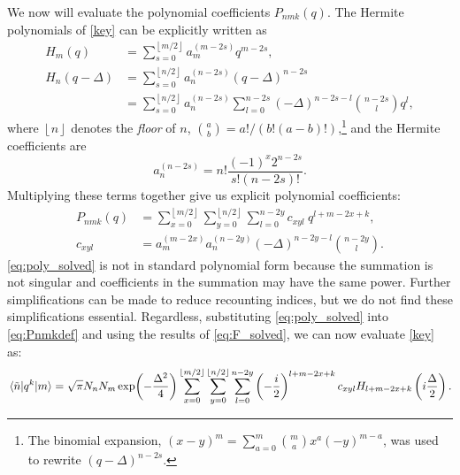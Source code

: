 \documentclass[aip, jcp, reprint, onecolumn, nofootinbib]{revtex4-2}
\begin{document}
We now will evaluate the polynomial coefficients $P_{nmk}(q)$.
The Hermite polynomials of \autoref{key} can be explicitly written as\cite{MorseFeshbach}
\begin{equation}
\begin{split}
	H_m(q) &= \sum_{s=0}^{\left\lfloor{m/2}\right\rfloor} a_m^{(m-2s)} q^{m-2s}, \\
	H_n(q-\Delta) &= \sum_{s=0}^{\left\lfloor{n/2}\right\rfloor}
	a_n^{(n-2s)} (q-\Delta)^{n-2s} \\
		&= \sum_{s=0}^{\left\lfloor{n/2}\right\rfloor} a_n^{(n-2s)} \sum_{l=0}^{n-2s} \left(-\Delta\right)^{n-2s-l} \binom{n-2s}{l} q^l,
\end{split}
\end{equation}
where $\left\lfloor n \right\rfloor$ denotes the \textit{floor} of $n$, $\binom{a}{b} = a! / (b!(a-b)!)$,\footnote{
	The binomial expansion, $(x-y)^m = \sum_{a=0}^m \binom{m}{a} x^a (-y)^{m-a}$, was used to rewrite $(q-\Delta)^{n-2s}$.
} and the Hermite coefficients are
\begin{equation}
	a_n^{(n-2s)} = n! \frac{(-1)^x 2^{n-2s}}{s!(n-2s)!}.
\end{equation}
Multiplying these terms together give us explicit polynomial coefficients:
\begin{equation}\label{eq:poly_solved}
\begin{split}
	P_{nmk}(q) %
	&= \sum_{x=0}^{\left\lfloor{m/2}\right\rfloor} \sum_{y=0}^{\left\lfloor{n/2}\right\rfloor} \sum_{l=0}^{n-2y} c_{xyl} \ q^{l+m-2x+k}, \\
	c_{xyl} &= a_m^{(m-2x)} a_n^{(n-2y)} \left(-\Delta\right)^{n-2y-l} \binom{n-2y}{l}.
\end{split}
\end{equation}
\autoref{eq:poly_solved} is not in standard polynomial form because the summation is not singular and coefficients in the summation may have the same power. 
Further simplifications can be made to reduce recounting indices, but we do not find these simplifications essential.
Regardless, substituting \autoref{eq:poly_solved} into \autoref{eq:Pnmkdef} and using the results of \autoref{eq:F_solved}, we can now evaluate \autoref{key} as:
\begin{equation}\label{eq:general_solution}
	\mel{\tilde{n}}{q^k}{m} = \sqrt{\pi} N_n N_m 
	\exp(-\frac{\Delta^2}{4}) \sum_{x=0}^{\left\lfloor{m/2}\right\rfloor} \sum_{y=0}^{\left\lfloor{n/2}\right\rfloor} \sum_{l=0}^{n-2y} \left( -\frac{i}{2} \right)^{l+m-2x+k} c_{xyl} H_{l+m-2x+k}\left(i\frac{\Delta}{2}\right).
\end{equation}
\end{document}
